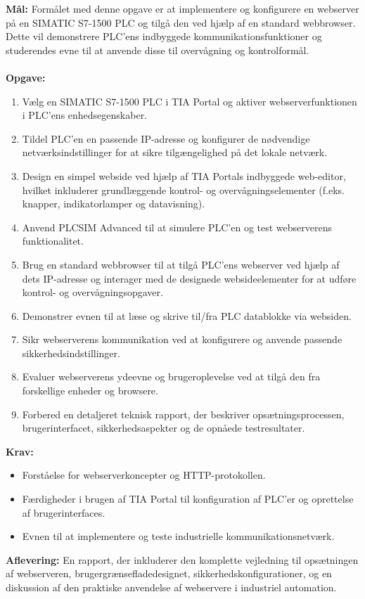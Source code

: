 \textbf{Mål:} Formålet med denne opgave er at implementere og konfigurere en webserver på en SIMATIC S7-1500 PLC og tilgå den ved hjælp af en standard webbrowser. Dette vil demonstrere PLC'ens indbyggede kommunikationsfunktioner og studerendes evne til at anvende disse til overvågning og kontrolformål.
\\\\
\noindent\textbf{Opgave:}
\begin{enumerate}
	\item Vælg en SIMATIC S7-1500 PLC i TIA Portal og aktiver webserverfunktionen i PLC'ens enhedsegenskaber.
	\item Tildel PLC'en en passende IP-adresse og konfigurer de nødvendige netværksindstillinger for at sikre tilgængelighed på det lokale netværk.
	\item Design en simpel webside ved hjælp af TIA Portals indbyggede web-editor, hvilket inkluderer grundlæggende kontrol- og overvågningselementer (f.eks. knapper, indikatorlamper og datavisning).
	\item Anvend PLCSIM Advanced til at simulere PLC'en og test webserverens funktionalitet.
	\item Brug en standard webbrowser til at tilgå PLC'ens webserver ved hjælp af dets IP-adresse og interager med de designede websideelementer for at udføre kontrol- og overvågningsopgaver.
	\item Demonstrer evnen til at læse og skrive til/fra PLC datablokke via websiden.
	\item Sikr webserverens kommunikation ved at konfigurere og anvende passende sikkerhedsindstillinger.
	\item Evaluer webserverens ydeevne og brugeroplevelse ved at tilgå den fra forskellige enheder og browsere.
	\item Forbered en detaljeret teknisk rapport, der beskriver opsætningsprocessen, brugerinterfacet, sikkerhedsaspekter og de opnåede testresultater.
\end{enumerate}
\textbf{Krav:}
\begin{itemize}
	\item Forståelse for webserverkoncepter og HTTP-protokollen.
	\item Færdigheder i brugen af TIA Portal til konfiguration af PLC'er og oprettelse af brugerinterfaces.
	\item Evnen til at implementere og teste industrielle kommunikationsnetværk.
\end{itemize}
\textbf{Aflevering:} En rapport, der inkluderer den komplette vejledning til opsætningen af webserveren, brugergrænsefladedesignet, sikkerhedskonfigurationer, og en diskussion af den praktiske anvendelse af webservere i industriel automation.

